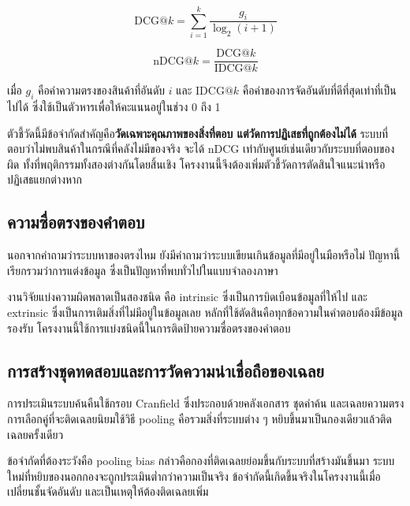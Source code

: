 \begin{equation}
\label{eq:dcg}
\mathrm{DCG@}k = \sum_{i=1}^{k} \frac{g_i}{\log_2(i+1)}
\end{equation}

\begin{equation}
\label{eq:ndcg}
\mathrm{nDCG@}k = \frac{\mathrm{DCG@}k}{\mathrm{IDCG@}k}
\end{equation}

เมื่อ $g_i$ คือค่าความตรงของสินค้าที่อันดับ $i$ และ $\mathrm{IDCG@}k$ คือค่าของการจัดอันดับที่ดีที่สุดเท่าที่เป็นไปได้ ซึ่งใช้เป็นตัวหารเพื่อให้คะแนนอยู่ในช่วง 0 ถึง 1

ตัวชี้วัดนี้มีข้อจำกัดสำคัญคือ\textbf{วัดเฉพาะคุณภาพของสิ่งที่ตอบ แต่วัดการปฏิเสธที่ถูกต้องไม่ได้} ระบบที่ตอบว่าไม่พบสินค้าในกรณีที่คลังไม่มีของจริง จะได้ nDCG เท่ากับศูนย์เช่นเดียวกับระบบที่ตอบของผิด ทั้งที่พฤติกรรมทั้งสองต่างกันโดยสิ้นเชิง โครงงานนี้จึงต้องเพิ่มตัวชี้วัดการตัดสินใจแนะนำหรือปฏิเสธแยกต่างหาก

\subsection{ความซื่อตรงของคำตอบ}

นอกจากคำถามว่าระบบหาของตรงไหม ยังมีคำถามว่าระบบเขียนเกินข้อมูลที่มีอยู่ในมือหรือไม่ ปัญหานี้เรียกรวมว่าการแต่งข้อมูล ซึ่งเป็นปัญหาที่พบทั่วไปในแบบจำลองภาษา \cite{ji2023hallucination}

งานวิจัยแบ่งความผิดพลาดเป็นสองชนิด \cite{maynez2020faithfulness} คือ intrinsic ซึ่งเป็นการบิดเบือนข้อมูลที่ให้ไป และ extrinsic ซึ่งเป็นการเติมสิ่งที่ไม่มีอยู่ในข้อมูลเลย หลักที่ใช้ตัดสินคือทุกข้อความในคำตอบต้องมีข้อมูลรองรับ \cite{rashkin2023attribution} โครงงานนี้ใช้การแบ่งชนิดนี้ในการติดป้ายความซื่อตรงของคำตอบ

\subsection{การสร้างชุดทดสอบและการวัดความน่าเชื่อถือของเฉลย}

การประเมินระบบค้นคืนใช้กรอบ Cranfield ซึ่งประกอบด้วยคลังเอกสาร ชุดคำค้น และเฉลยความตรง \cite{voorhees2005trec} การเลือกคู่ที่จะติดเฉลยนิยมใช้วิธี pooling คือรวมสิ่งที่ระบบต่าง ๆ หยิบขึ้นมาเป็นกองเดียวแล้วติดเฉลยครั้งเดียว

ข้อจำกัดที่ต้องระวังคือ pooling bias \cite{zobel1998reliable} กล่าวคือกองที่ติดเฉลยย่อมขึ้นกับระบบที่สร้างมันขึ้นมา ระบบใหม่ที่หยิบของนอกกองจะถูกประเมินต่ำกว่าความเป็นจริง ข้อจำกัดนี้เกิดขึ้นจริงในโครงงานนี้เมื่อเปลี่ยนชั้นจัดอันดับ และเป็นเหตุให้ต้องติดเฉลยเพิ่ม

